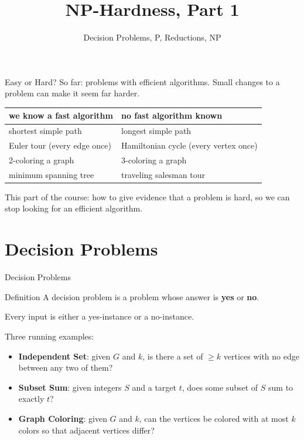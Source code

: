 \documentclass[10pt,aspectratio=169]{beamer}
\title{NP-Hardness, Part 1}
\subtitle{Decision Problems, P, Reductions, NP}
\date{}
\author{}
\begin{document}
\maketitle

\begin{frame}{Easy or Hard?}
  So far: problems with efficient algorithms. Small changes to a problem can
  make it seem far harder.

  \bigskip
  \begin{center}
  \begin{tabular}{ll}
    \toprule
    we know a fast algorithm & no fast algorithm known \\
    \midrule
    shortest simple path & longest simple path \\
    Euler tour (every \alert{edge} once) & Hamiltonian cycle (every
      \alert{vertex} once) \\
    2-coloring a graph & 3-coloring a graph \\
    minimum spanning tree & traveling salesman tour \\
    \bottomrule
  \end{tabular}
  \end{center}

  \pause
  \bigskip
  This part of the course: how to give evidence that a problem is
  \alert{hard}, so we can stop looking for an efficient algorithm.
\end{frame}

\section{Decision Problems}

\begin{frame}{Decision Problems}
  \begin{block}{Definition}
    A \alert{decision problem} is a problem whose answer is \textbf{yes} or
    \textbf{no}.
  \end{block}

  Every input is either a \alert{yes-instance} or a \alert{no-instance}.

  \bigskip
  Three running examples:
  \begin{itemize}
    \item \textbf{Independent Set}: given $G$ and $k$, is there a set of
          $\ge k$ vertices with no edge between any two of them?
    \item \textbf{Subset Sum}: given integers $S$ and a target $t$, does some
          subset of $S$ sum to exactly $t$?
    \item \textbf{Graph Coloring}: given $G$ and $k$, can the vertices be
          colored with at most $k$ colors so that adjacent vertices differ?
  \end{itemize}
\end{frame}
\end{document}
